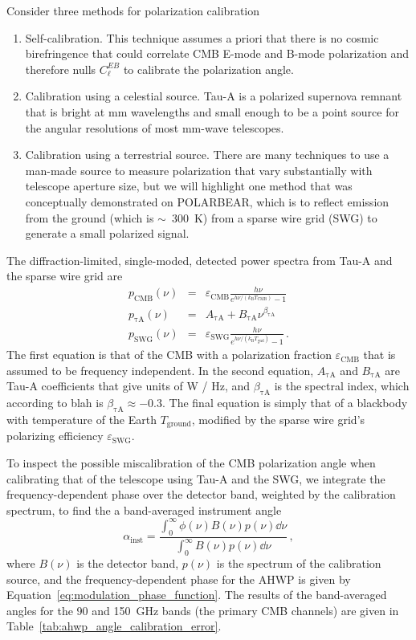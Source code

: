 Consider three methods for polarization calibration
\begin{enumerate}
    \item Self-calibration. This technique assumes a priori that there is no cosmic birefringence that could correlate CMB E-mode and B-mode polarization and therefore nulls $C_{\ell}^{EB}$ to calibrate the polarization angle.
    \item Calibration using a celestial source. Tau-A is a polarized supernova remnant that is bright at mm wavelengths and small enough to be a point source for the angular resolutions of most mm-wave telescopes. 
    \item Calibration using a terrestrial source. There are many techniques to use a man-made source to measure polarization that vary substantially with telescope aperture size, but we will highlight one method that was conceptually demonstrated on POLARBEAR, which is to reflect emission from the ground (which is $\sim$~300~K) from a sparse wire grid (SWG) to generate a small polarized signal.
\end{enumerate}
The diffraction-limited, single-moded, detected power spectra from Tau-A and the sparse wire grid are
\begin{eqnarray}
    p_{\mathrm{CMB}}(\nu) & = & \varepsilon_{\mathrm{CMB}} \frac{h \nu}{e^{h \nu / ( k_{\mathrm{B}} T_{\mathrm{CMB}} )} - 1} \\
    p_{\mathrm{\tau A}}(\nu) & = & A_{\mathrm{\tau A}} + B_{\mathrm{\tau A}} \nu^{\beta_{\mathrm{\tau A}}} \\
    p_{\mathrm{SWG}}(\nu) & = & \varepsilon_{\mathrm{SWG}} \frac{h \nu}{e^{h \nu / ( k_{\mathrm{B}} T_{\mathrm{gnd}} )} - 1} \, .
   \label{eq:tau_a_spectrum}
\end{eqnarray}
The first equation is that of the CMB with a polarization fraction $\varepsilon_{\mathrm{CMB}}$ that is assumed to be frequency independent.
In the second equation, $A_{\mathrm{\tau A}}$ and $B_{\mathrm{\tau A}}$ are Tau-A coefficients that give units of W / Hz, and $\beta_{\mathrm{\tau A}}$ is the spectral index, which according to blah is $\beta_{\mathrm{\tau A}} \approx -0.3$. The final equation is simply that of a blackbody with temperature of the Earth $T_{\mathrm{ground}}$, modified by the sparse wire grid's polarizing efficiency $\varepsilon_{\mathrm{SWG}}$. 

To inspect the possible miscalibration of the CMB polarization angle when calibrating that of the telescope using Tau-A and the SWG, we integrate the frequency-dependent phase over the detector band, weighted by the calibration spectrum, to find the a band-averaged instrument angle
\begin{equation}
    \alpha_{\mathrm{inst}} = \frac{\int_{0}^{\infty} \phi(\nu) B(\nu) p(\nu) \dd \nu}{\int_{0}^{\infty} B(\nu) p(\nu) \dd \nu} \, ,
    \label{eq:band_averaged_polarization_angle}
\end{equation}
where $B(\nu)$ is the detector band, $p(\nu)$ is the spectrum of the calibration source, and the frequency-dependent phase for the AHWP is given by Equation~\ref{eq:modulation_phase_function}. The results of the band-averaged angles for the 90 and 150~GHz bands (the primary CMB channels) are given in Table~\ref{tab:ahwp_angle_calibration_error}.

